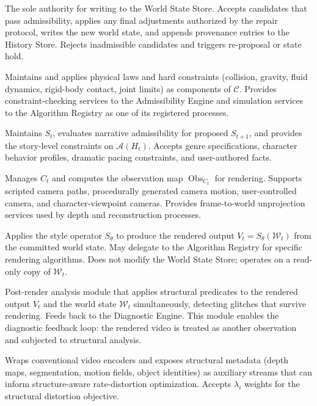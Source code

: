 \documentclass[11pt,a4paper]{article}
\theoremstyle{plain}
\theoremstyle{definition}
\theoremstyle{remark}
\DeclareMathOperator{\Obs}{Obs}
\begin{document}
\begin{description}[leftmargin=2em,itemsep=6pt]
\item[\textbf{Commitment Engine (CE).}] The sole authority for writing to the World State Store. Accepts candidates that pass admissibility, applies any final adjustments authorized by the repair protocol, writes the new world state, and appends provenance entries to the History Store. Rejects inadmissible candidates and triggers re-proposal or state hold.

\item[\textbf{Physics/Constraint Engine (PCE).}] Maintains and applies physical laws and hard constraints (collision, gravity, fluid dynamics, rigid-body contact, joint limits) as components of $\mathcal{C}$. Provides constraint-checking services to the Admissibility Engine and simulation services to the Algorithm Registry as one of its registered processes.

\item[\textbf{Narrative State Engine (NSE).}] Maintains $S_t$, evaluates narrative admissibility for proposed $S_{t+1}$, and provides the story-level constraints on $\mathcal{A}(H_t)$. Accepts genre specifications, character behavior profiles, dramatic pacing constraints, and user-authored facts.

\item[\textbf{Camera/Observation Engine (COE).}] Manages $C_t$ and computes the observation map $\Obs_{C_t}$ for rendering. Supports scripted camera paths, procedurally generated camera motion, user-controlled camera, and character-viewpoint cameras. Provides frame-to-world unprojection services used by depth and reconstruction processes.

\item[\textbf{Style/Realization Engine (SRE).}] Applies the style operator $S_\theta$ to produce the rendered output $V_t = S_\theta(\mathcal{W}_t)$ from the committed world state. May delegate to the Algorithm Registry for specific rendering algorithms. Does not modify the World State Store; operates on a read-only copy of $\mathcal{W}_t$.

\item[\textbf{Structural Analyzer (SA).}] Post-render analysis module that applies structural predicates to the rendered output $V_t$ and the world state $\mathcal{W}_t$ simultaneously, detecting glitches that survive rendering. Feeds back to the Diagnostic Engine. This module enables the diagnostic feedback loop: the rendered video is treated as another observation and subjected to structural analysis.

\item[\textbf{Encoder/Codec Interface (ECI).}] Wraps conventional video encoders and exposes structural metadata (depth maps, segmentation, motion fields, object identities) as auxiliary streams that can inform structure-aware rate-distortion optimization. Accepts $\lambda_i$ weights for the structural distortion objective.


\end{description}
\end{document}
